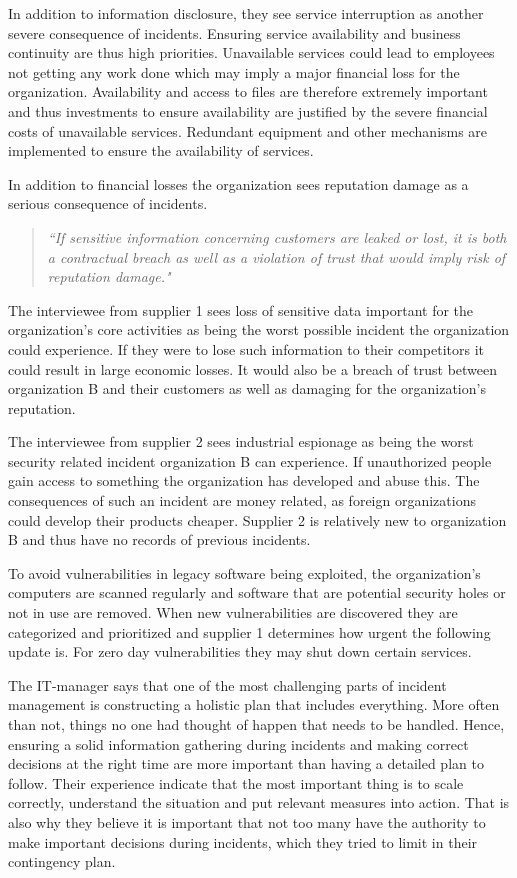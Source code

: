 In addition to information disclosure, they see service interruption as another severe consequence of incidents. Ensuring service availability and business continuity are thus high priorities. Unavailable services could lead to employees not getting any work done which may imply a major financial loss for the organization. Availability and access to files are therefore extremely important and thus investments to ensure availability are justified by the severe financial costs of unavailable services. Redundant equipment and other mechanisms are implemented to ensure the availability of services. 

In addition to financial losses the organization sees reputation damage as a serious consequence of incidents. 
\begin{quote}
\textit{``If sensitive information concerning customers are leaked or lost, it is both a contractual breach as well as a violation of trust that would imply risk of reputation damage."}
\end{quote}

The interviewee from supplier 1 sees loss of sensitive data important for the organization's core activities as being the worst possible incident the organization could experience. If they were to lose such information to their competitors it could result in large economic losses. It would also be a breach of trust between organization B and their customers as well as damaging for the organization's reputation.	

The interviewee from supplier 2 sees industrial espionage as being the worst security related incident organization B can experience. If unauthorized people gain access to something the organization has developed and abuse this. The consequences of such an incident are money related, as foreign organizations could develop their products cheaper. Supplier 2 is relatively new to organization B and thus have no records of previous incidents.

To avoid vulnerabilities in legacy software being exploited, the organization's computers are scanned regularly and software that are potential security holes or not in use are removed. When new vulnerabilities are discovered they are categorized and prioritized and supplier 1 determines how urgent the following update is. For zero day vulnerabilities they may shut down certain services.

The IT-manager says that one of the most challenging parts of incident management is constructing a holistic plan that includes everything. More often than not, things no one had thought of happen that needs to be handled. Hence, ensuring a solid information gathering during incidents and making correct decisions at the right time are more important than having a detailed plan to follow. Their experience indicate that the most important thing is to scale correctly, understand the situation and put relevant measures into action. That is also why they believe it is important that not too many have the authority to make important decisions during incidents, which they tried to limit in their contingency plan.

